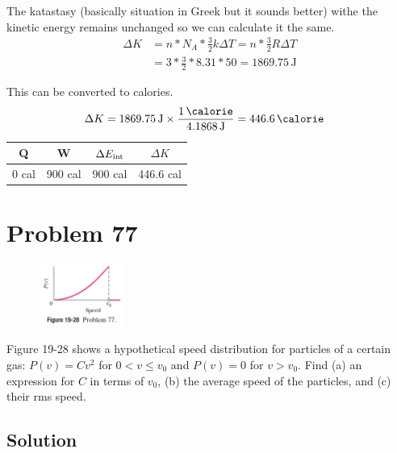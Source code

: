 \documentclass[12pt]{article}
\begin{document}
            The katastasy (basically situation in Greek but it sounds better) withe the kinetic energy remains unchanged so we can calculate it the same.
            \begin{align}
                \Delta K    &=  n * N_A * \frac{3}{2}k \Delta T
                    =   n * \frac{3}{2}R \Delta T\\
                    &=  3 * \frac{3}{2} * 8.31 * 50
                    =   1869.75\,\unit{\joule}
            \end{align}

            This can be converted to calories.
            \begin{align}
                \Delta K    &=  1869.75\,\unit{\joule} \times \frac{1\,\unit{\calorie}}{4.1868\,\unit{\joule}}
                    =   446.6\,\unit{\calorie}
            \end{align}

            \begin{center}
                \begin{tabular}{c | c | c | c}
                    Q   &   W   &   $\Delta E_{\rm int}$    &   $\Delta K$\\
                    \hline
                    0 cal   &   900 cal &   900 cal   &   446.6 cal
                \end{tabular}
            \end{center}

    \pagebreak
    \section{Problem 77}
        \begin{figure}
            \vspace{-30pt}
            \includegraphics[width=0.25\textwidth]{picture_19-28.png} 
        \end{figure}
        Figure 19-28 shows a hypothetical speed distribution for particles of a certain gas: $P(v) = Cv^2$ for $0 < v \leq v_0$ and $P(v) = 0$ for $v > v_0$.
        Find (a) an expression for $C$ in terms of $v_0$, (b) the average speed of the particles, and (c) their rms speed.

        \subsection{Solution}

    \pagebreak
    
    \tableofcontents
\end{document}
